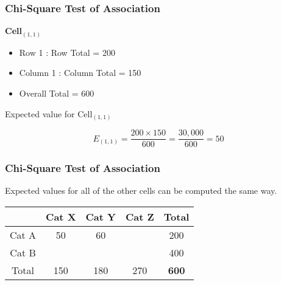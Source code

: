 \documentclass[a4]{beamer}
\begin{document}
\begin{frame}
\frametitle{Chi-Square Test of Association}
\Large
\textbf{Cell$_{(1,1)}$}
\begin{itemize}
\item Row 1 : Row Total = 200
\item Column 1 : Column Total = 150
\item Overall Total = 600
\end{itemize}
\bigskip


Expected value for Cell$_{(1,1)}$

\[ E_{(1,1)} = \frac{200 \times 150}{600} = \frac{30,000}{600} = 50 \]
\end{frame}
\begin{frame}
\frametitle{Chi-Square Test of Association}

\Large
Expected values for all of the other cells can be computed the same way.
\begin{center}
\begin{tabular}{|c|c|c|c|c|}
\hline & Cat X & Cat Y & Cat Z & Total  \\ \hline
Cat A & 50 & 60 &  & 200\\ \hline
Cat B & \phantom{space}& \phantom{space} & \phantom{space} & 400 \\ \hline
Total & 150 & 180 & 270 &  \textbf{600}\\ \hline

\end{tabular} 
\end{center}


\end{frame}

\end{document}

